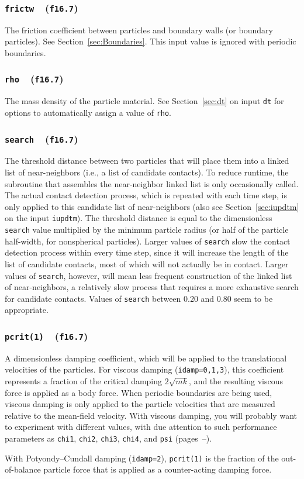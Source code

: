 \documentclass[letterpaper,11pt]{article}
\newcommand{\Var}[2]{\texttt{#1}\ \  (\texttt{#2})}
\begin{document}
\subsubsection[\texttt{frictw}]{\Var{frictw}{f16.7}}\label{sec:frictw}
The friction coefficient between particles and boundary walls (or
boundary particles).  See Section~\ref{sec:Boundaries}.
This input value is ignored with periodic boundaries.
%
\subsubsection[\texttt{rho}]{\Var{rho}{f16.7}}\label{sec:rho}
The mass density of the particle material.
See Section~\ref{sec:dt} on input \texttt{dt}
for options to automatically assign
a value of \texttt{rho}.
%
\subsubsection[\texttt{search}]{\Var{search}{f16.7}}\label{sec:search}
The threshold distance between two particles that will place them
into a linked list of near-neighbors
(i.e., a list of candidate contacts).
To reduce runtime,
the subroutine that assembles the near-neighbor 
linked list is only occasionally
called.
The actual contact detection process, which is repeated with each time
step, is only applied to this candidate list of near-neighbors
(also see Section~\ref{sec:iupdtm} on the input \texttt{iupdtm}).
The threshold distance is equal to the dimensionless \texttt{search} 
value multiplied by the minimum particle radius
(or half of the particle half-width, for nonspherical particles).
Larger values of \texttt{search} slow the contact detection process
within every time step, 
since it will increase the length of the list of candidate contacts,
most of which will not actually be in contact.
Larger values of \texttt{search}, however, will mean less frequent
construction
of the linked list of near-neighbors, a relatively slow process
that requires a more exhaustive search for candidate contacts.
Values of \texttt{search} between 0.20 and 0.80 seem to be appropriate.
%
\subsubsection[\texttt{pcrit(1)}]{\Var{pcrit(1)}{f16.7}}\label{sec:pcrit1}
A dimensionless damping coefficient, which will be applied to the
translational velocities of the particles.
For viscous damping (\texttt{idamp=0,1,3}),
this coefficient represents a fraction of the critical damping
$2\sqrt{mk}$, and the resulting viscous force is applied as a body force.
When periodic boundaries are being used, viscous damping is only
applied to the particle velocities that are measured relative to the
mean-field velocity.
With viscous damping,
you will probably want to experiment with different values, with
due attention to such performance parameters as \texttt{chi1},
\texttt{chi2}, \texttt{chi3}, \texttt{chi4}, and \texttt{psi}
(pages~\pageref{sec:chi1}--\pageref{sec:chi4}).
\par
With Potyondy--Cundall damping (\texttt{idamp=2}),
\texttt{pcrit(1)} is the fraction of the out-of-balance
particle force that is applied as a counter-acting
damping force.
%
\end{document}
